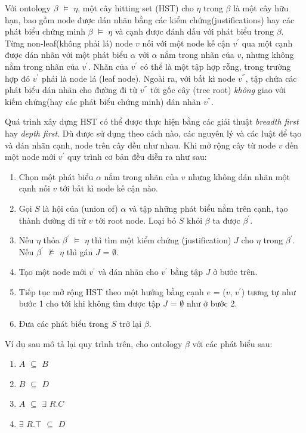 \hspace*{.05\textwidth} Với ontology $\beta$ $\models$ $\eta$, một cây hitting set (HST) cho $\eta$ trong $\beta$ là một cây hữu hạn, bao gồm node được dán nhãn bằng các kiểm chứng(justifications) hay các phát biểu chứng minh $\beta$ $\models$ $\eta$ và cạnh được đánh dấu với phát biểu trong $\beta$. Từng non-leaf(không phải lá) node $v$ nối với một node kế cận $v^{'}$ qua một cạnh được dán nhãn với một phát biểu $\alpha$ với $\alpha$ nẳm trong nhãn của $v$, nhưng không nằm trong nhãn của $v^{'}$. Nhãn của $v^{'}$ có thể là một tập hợp rỗng, trong trường hợp đó $v^{'}$ phải là node lá (leaf node). Ngoài ra, với bất kì node $v^{''}$, tập chứa các phát biểu dán nhãn cho đường đi từ $v^{''}$ tới gốc cây (tree root) \textit{không} giao với kiếm chứng(hay các phát biểu chứng minh) dán nhãn $v^{''}$.

\hspace*{.05\textwidth} Quá trình xây dựng HST có thể được thực hiện bằng các giải thuật \textit{breadth first} hay \textit{depth first}. Dù được sử dụng theo cách nào, các nguyên lý và các luật để tạo và dán nhãn cạnh, node trên cây đều như nhau. Khi mở rộng cây từ node $v$ đến một node mới $v^{'}$ quy trình cơ bản đều diễn ra như sau:
		\begin{enumerate}
			\item Chọn một phát biểu $\alpha$ nẳm trong nhãn của $v$ nhưng không dán nhãn một cạnh nối $v$ tới bất kì node kế cận nào.
			\item Gọi $S$ là hội của (union of) {$\alpha$} và tập những phát biểu nằm trên cạnh, tạo thành đường đi từ $v$ tới root node. Loại bỏ $S$ khỏi $\beta$ ta được $\beta^{'}$.
			\item Nếu $\eta$ thỏa $\beta^{'}$ $\models$ $\eta$ thì tìm một kiểm chứng (justification) $J$ cho $\eta$ trong $\beta^{'}$. Nếu $\beta^{'}$ $\not\models$ $\eta$ thì gán $J$ = $\emptyset$.
			\item Tạo một node mới $v^{'}$ và dán nhãn cho $v^{'}$ bằng tập $J$ ở bước trên.
			\item Tiếp tục mở rộng HST theo một hướng bằng cạnh $e$ = ($v$, $v^{'}$) tương tự như bước 1 cho tới khi không tìm được tập $J$ = $\emptyset$ như ở bước 2.
			\item Đưa các phát biểu trong $S$ trở lại $\beta$.
		\end{enumerate}
		Ví dụ sau mô tả lại quy trình trên, cho ontology $\beta$  với các phát biểu sau:
		\begin{enumerate}
			\item $A$ $\subseteq$ $B$
			\item $B$ $\subseteq$ $D$ 
			\item $A$ $\subseteq$ $\exists$ $R.C$ 
			\item $\exists$ $R.\top$ $\subseteq$ $D$
		\end{enumerate} 

